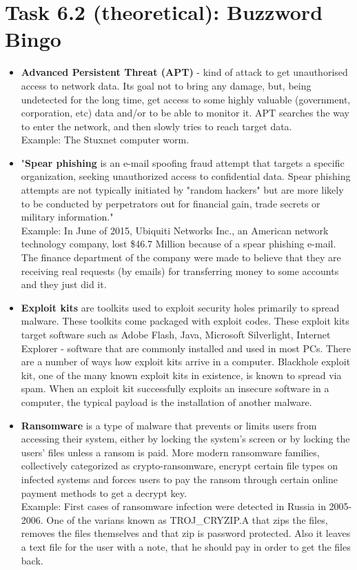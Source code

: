 \documentclass{article}
\begin{document}
\section*{Task 6.2 (theoretical): Buzzword Bingo}
\begin{itemize}
\item \textbf{Advanced Persistent Threat (APT)} - kind of attack to get unauthorised access to network data. Its goal not to bring any damage, but, being undetected for the long time, get access to some highly valuable (government, corporation, etc) data and/or to be able to monitor it. APT searches the way to enter the network, and then slowly tries to reach target data. \cite{apt}
\\
Example: The Stuxnet computer worm.
\item "\textbf{Spear phishing} is an e-mail spoofing fraud attempt that targets a specific organization, seeking unauthorized access to confidential data. Spear phishing attempts are not typically initiated by "random hackers" but are more likely to be conducted by perpetrators out for financial gain, trade secrets or military information." \cite{sp-phish}
\\
Example: In June of 2015, Ubiquiti Networks Inc., an American network technology company, lost \$46.7 Million because of a spear phishing e-mail. The finance department of the company were made to believe that they are receiving real requests (by emails) for transferring money to some accounts and they just did it. \cite{sp-phish-ex}
\item \textbf{Exploit kits} are toolkits used to exploit security holes primarily to spread malware. These toolkits come packaged with exploit codes. These exploit kits target software such as Adobe Flash, Java, Microsoft Silverlight, Internet Explorer - software that are commonly installed and used in most PCs. There are a number of ways how exploit kits arrive in a computer. Blackhole exploit kit, one of the many known exploit kits in existence, is known to spread via spam. When an exploit kit successfully exploits an insecure software in a computer, the typical payload is the installation of another malware. \cite{exp-kit}
\item \textbf{Ransomware} is a type of malware that prevents or limits users from accessing their system, either by locking the system's screen or by locking the users' files unless a ransom is paid. More modern ransomware families, collectively categorized as crypto-ransomware, encrypt certain file types on infected systems and forces users to pay the ransom through certain online payment methods to get a decrypt key. \cite{ransm}
\\
Example: First cases of ransomware infection were detected in Russia in 2005-2006. One of the varians known as TROJ\_CRYZIP.A that zips the files, removes the files themselves and that zip is password protected. Also it leaves a text file for the user with a note, that he should pay in order to get the files back. \cite{ransm}
\end{itemize}
\end{document}
